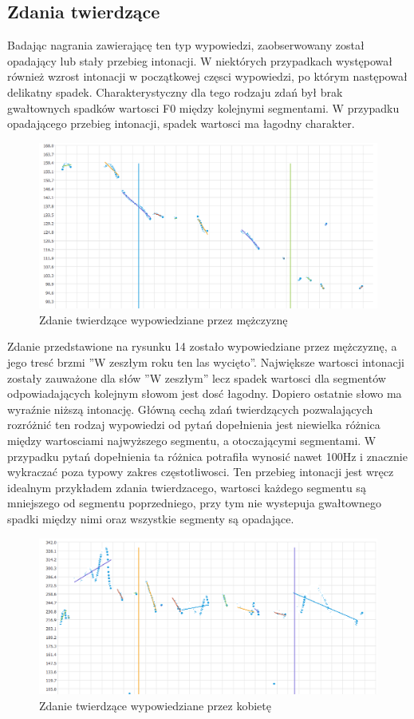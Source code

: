 \documentclass[a4paper,12 pt]{article}
\begin{document}
\subsection{Zdania twierdzące}
Badając nagrania zawierającę ten typ wypowiedzi, zaobserwowany został opadający lub stały przebieg intonacji. W niektórych przypadkach występował również wzrost intonacji w początkowej częsci wypowiedzi, po którym następował delikatny spadek. Charakterystyczny dla tego rodzaju zdań był brak gwałtownych spadków wartosci F0 między kolejnymi segmentami. W przypadku opadającego przebieg intonacji, spadek wartosci ma łagodny charakter.
 \FloatBarrier
\begin{figure}[h]
\centering
\includegraphics[scale=0.7]{twierdzace_walczyc.png}
\caption{Zdanie twierdzące wypowiedziane przez mężczyznę}
\end{figure}
\FloatBarrier
Zdanie przedstawione na rysunku 14 zostało wypowiedziane przez mężczyznę, a jego tresć brzmi ''W zeszłym roku ten las wycięto''. Największe wartosci intonacji zostały zauważone dla słów ''W zeszłym'' lecz spadek wartosci dla segmentów odpowiadających kolejnym słowom jest dosć łagodny. Dopiero ostatnie słowo ma wyraźnie niższą intonację. Główną cechą zdań twierdzących pozwalających rozróżnić ten rodzaj wypowiedzi od pytań dopełnienia jest niewielka różnica między wartosciami najwyższego segmentu, a otoczającymi segmentami. W przypadku pytań dopełnienia ta różnica potrafiła wynosić nawet 100Hz i znacznie wykraczać poza typowy zakres częstotliwosci. Ten przebieg intonacji jest wręcz idealnym przykładem zdania twierdzacego, wartosci każdego segmentu są mniejszego od segmentu poprzedniego, przy tym nie wystepuja gwałtownego spadki między nimi oraz wszystkie segmenty są opadające.
 \FloatBarrier
\begin{figure}[h]
\centering
\includegraphics[scale=0.7]{twierdzace_coraz.png}
\caption{Zdanie twierdzące wypowiedziane przez kobietę}
\end{figure}
\end{document}
